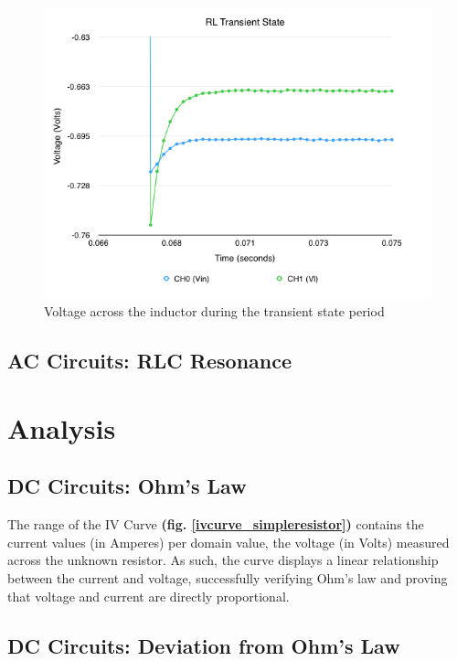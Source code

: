 \documentclass{article}
\begin{document}
\begin{figure}[H]
    \centering
    \includegraphics[width=\textwidth]{charts/rlcurve_transient}
    \caption{Voltage across the inductor during the transient state period}
    \label{rlcurve_transient}
\end{figure}

\subsection{AC Circuits: RLC Resonance}

\section{Analysis}

\subsection{DC Circuits: Ohm's Law}

The range of the IV Curve \textbf{(fig. \ref{ivcurve_simpleresistor})} contains
the current values (in Amperes) per domain value, the voltage (in Volts)
measured across the unknown resistor. As such, the curve displays a linear
relationship between the current and voltage, successfully verifying Ohm's law
and proving that voltage and current are directly proportional.

\subsection{DC Circuits: Deviation from Ohm's Law}
\end{document}
